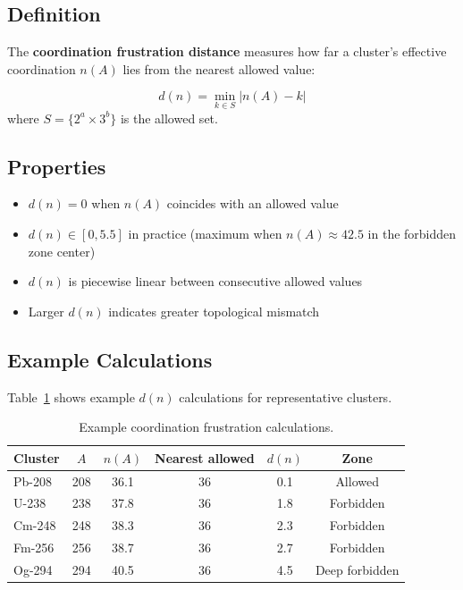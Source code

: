 \subsection{Definition}

The \textbf{coordination frustration distance} measures how far a cluster's
effective coordination $n(A)$ lies from the nearest allowed value:

\begin{derivationbox}
    \begin{equation}
        d(n) = \min_{k \in S} |n(A) - k|
        \label{eq:f:d_n}
    \end{equation}
    where $S = \{2^a \times 3^b\}$ is the allowed set.
    \tagDer
\end{derivationbox}

\subsection{Properties}

\begin{itemize}
    \item $d(n) = 0$ when $n(A)$ coincides with an allowed value
    \item $d(n) \in [0, 5.5]$ in practice (maximum when $n(A) \approx 42.5$
          in the forbidden zone center)
    \item $d(n)$ is piecewise linear between consecutive allowed values
    \item Larger $d(n)$ indicates greater topological mismatch
\end{itemize}

\subsection{Example Calculations}

Table~\ref{tab:f:examples} shows example $d(n)$ calculations for representative
clusters.

\begin{table}[h]
\centering
\caption{Example coordination frustration calculations.}
\label{tab:f:examples}
\begin{tabular}{lccccc}
    \toprule
    Cluster & $A$ & $n(A)$ & Nearest allowed & $d(n)$ & Zone \\
    \midrule
    Pb-208 & 208 & 36.1 & 36 & 0.1 & Allowed \\
    U-238 & 238 & 37.8 & 36 & 1.8 & Forbidden \\
    Cm-248 & 248 & 38.3 & 36 & 2.3 & Forbidden \\
    Fm-256 & 256 & 38.7 & 36 & 2.7 & Forbidden \\
    Og-294 & 294 & 40.5 & 36 & 4.5 & Deep forbidden \\
    \bottomrule
\end{tabular}
\end{table}

